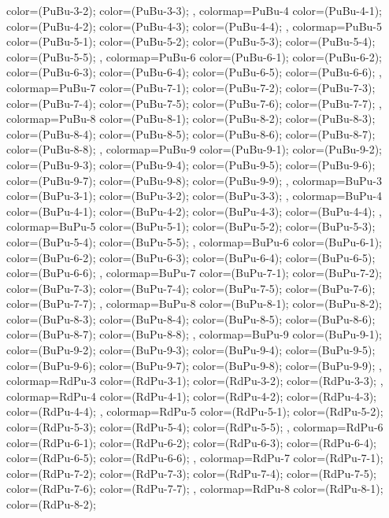 {{  color=(PuBu-3-2);
  color=(PuBu-3-3);
},
colormap={PuBu-4}{
  color=(PuBu-4-1);
  color=(PuBu-4-2);
  color=(PuBu-4-3);
  color=(PuBu-4-4);
},
colormap={PuBu-5}{
  color=(PuBu-5-1);
  color=(PuBu-5-2);
  color=(PuBu-5-3);
  color=(PuBu-5-4);
  color=(PuBu-5-5);
},
colormap={PuBu-6}{
  color=(PuBu-6-1);
  color=(PuBu-6-2);
  color=(PuBu-6-3);
  color=(PuBu-6-4);
  color=(PuBu-6-5);
  color=(PuBu-6-6);
},
colormap={PuBu-7}{
  color=(PuBu-7-1);
  color=(PuBu-7-2);
  color=(PuBu-7-3);
  color=(PuBu-7-4);
  color=(PuBu-7-5);
  color=(PuBu-7-6);
  color=(PuBu-7-7);
},
colormap={PuBu-8}{
  color=(PuBu-8-1);
  color=(PuBu-8-2);
  color=(PuBu-8-3);
  color=(PuBu-8-4);
  color=(PuBu-8-5);
  color=(PuBu-8-6);
  color=(PuBu-8-7);
  color=(PuBu-8-8);
},
colormap={PuBu-9}{
  color=(PuBu-9-1);
  color=(PuBu-9-2);
  color=(PuBu-9-3);
  color=(PuBu-9-4);
  color=(PuBu-9-5);
  color=(PuBu-9-6);
  color=(PuBu-9-7);
  color=(PuBu-9-8);
  color=(PuBu-9-9);
},
colormap={BuPu-3}{
  color=(BuPu-3-1);
  color=(BuPu-3-2);
  color=(BuPu-3-3);
},
colormap={BuPu-4}{
  color=(BuPu-4-1);
  color=(BuPu-4-2);
  color=(BuPu-4-3);
  color=(BuPu-4-4);
},
colormap={BuPu-5}{
  color=(BuPu-5-1);
  color=(BuPu-5-2);
  color=(BuPu-5-3);
  color=(BuPu-5-4);
  color=(BuPu-5-5);
},
colormap={BuPu-6}{
  color=(BuPu-6-1);
  color=(BuPu-6-2);
  color=(BuPu-6-3);
  color=(BuPu-6-4);
  color=(BuPu-6-5);
  color=(BuPu-6-6);
},
colormap={BuPu-7}{
  color=(BuPu-7-1);
  color=(BuPu-7-2);
  color=(BuPu-7-3);
  color=(BuPu-7-4);
  color=(BuPu-7-5);
  color=(BuPu-7-6);
  color=(BuPu-7-7);
},
colormap={BuPu-8}{
  color=(BuPu-8-1);
  color=(BuPu-8-2);
  color=(BuPu-8-3);
  color=(BuPu-8-4);
  color=(BuPu-8-5);
  color=(BuPu-8-6);
  color=(BuPu-8-7);
  color=(BuPu-8-8);
},
colormap={BuPu-9}{
  color=(BuPu-9-1);
  color=(BuPu-9-2);
  color=(BuPu-9-3);
  color=(BuPu-9-4);
  color=(BuPu-9-5);
  color=(BuPu-9-6);
  color=(BuPu-9-7);
  color=(BuPu-9-8);
  color=(BuPu-9-9);
},
colormap={RdPu-3}{
  color=(RdPu-3-1);
  color=(RdPu-3-2);
  color=(RdPu-3-3);
},
colormap={RdPu-4}{
  color=(RdPu-4-1);
  color=(RdPu-4-2);
  color=(RdPu-4-3);
  color=(RdPu-4-4);
},
colormap={RdPu-5}{
  color=(RdPu-5-1);
  color=(RdPu-5-2);
  color=(RdPu-5-3);
  color=(RdPu-5-4);
  color=(RdPu-5-5);
},
colormap={RdPu-6}{
  color=(RdPu-6-1);
  color=(RdPu-6-2);
  color=(RdPu-6-3);
  color=(RdPu-6-4);
  color=(RdPu-6-5);
  color=(RdPu-6-6);
},
colormap={RdPu-7}{
  color=(RdPu-7-1);
  color=(RdPu-7-2);
  color=(RdPu-7-3);
  color=(RdPu-7-4);
  color=(RdPu-7-5);
  color=(RdPu-7-6);
  color=(RdPu-7-7);
},
colormap={RdPu-8}{
  color=(RdPu-8-1);
  color=(RdPu-8-2);
}}
